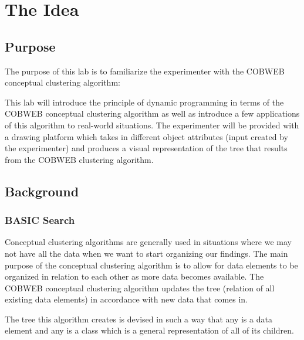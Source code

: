 %
%
%

\section{The Idea}
\subsection{Purpose}
The purpose of this lab is to familiarize the experimenter with the COBWEB
conceptual clustering algorithm:


This lab will introduce the principle of dynamic programming in terms of the
COBWEB conceptual clustering algorithm as well as introduce a few applications
of this algorithm to real-world situations. The experimenter will be provided
with a drawing platform which takes in different object attributes (input
created by the experimenter) and produces a visual representation of the tree
that results from the COBWEB clustering algorithm. 


\subsection{Background}
\subsubsection{BASIC Search}
Conceptual clustering algorithms are generally used in situations where we may
not have all the data when we want to start organizing our findings. The main
purpose of the conceptual clustering algorithm is to allow for data elements to
be organized in relation to each other as more data becomes available. The
COBWEB conceptual clustering algorithm updates the tree (relation of all
existing data elements) in accordance with new data that comes in.

The tree this algorithm creates is devised in such a way that any
 is a data element and any  is a class
which is a general representation of all of its children.

